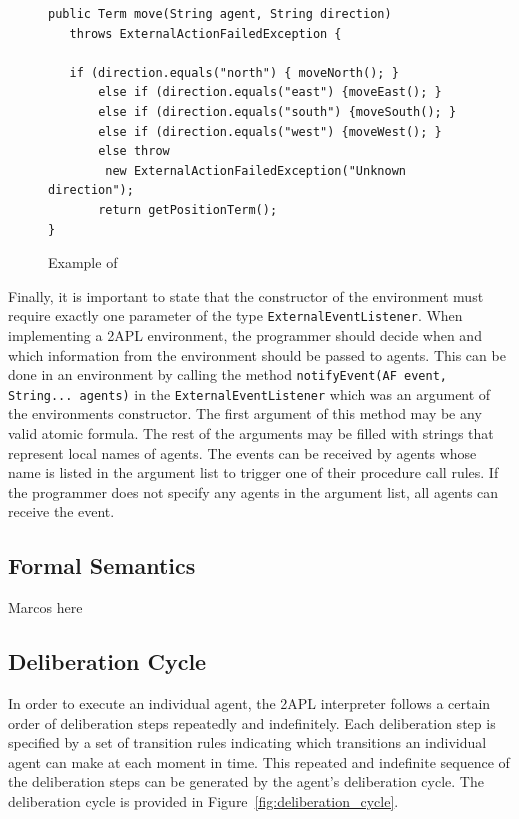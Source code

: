\documentclass[a4paper]{article}
\begin{document}
\begin{figure}[htp]
\begin{verbatim}
public Term move(String agent, String direction)
   throws ExternalActionFailedException {
  	   
   if (direction.equals("north") { moveNorth(); }
   	   else if (direction.equals("east") {moveEast(); }
   	   else if (direction.equals("south") {moveSouth(); }
   	   else if (direction.equals("west") {moveWest(); }
   	   else throw
        new ExternalActionFailedException("Unknown direction");
   	   return getPositionTerm();
}
\end{verbatim}
\caption{Example of}
\label{fig:example_env}
\end{figure}

Finally, it is important to state that the constructor of the environment must require exactly one parameter of the type \texttt{ExternalEventListener}. When implementing a 2APL environment, the programmer should decide when and which information from the environment should be passed to agents. This can be done in an environment by calling the method \texttt{notifyEvent(AF event, String... agents)} in the \texttt{ExternalEventListener} which was an argument of the environments constructor. The first argument of this method may be any valid atomic formula. The rest of the arguments may be filled with strings that represent local names of agents. The events can be received by agents whose name is listed in the argument list to trigger one of their procedure call rules. If the programmer does not specify any agents in the argument list, all agents can receive the event. 

\subsection{Formal Semantics} %

Marcos here

\subsection{Deliberation Cycle} %

In order to execute an individual agent, the 2APL interpreter follows a certain order of deliberation steps repeatedly and indefinitely. Each deliberation step is specified by a set of transition rules indicating which transitions an individual agent can make at each moment in time. This repeated and indefinite sequence of the deliberation steps can be generated by the agent’s deliberation cycle. The deliberation cycle is provided in Figure~\ref{fig:deliberation_cycle}.
\end{document}
